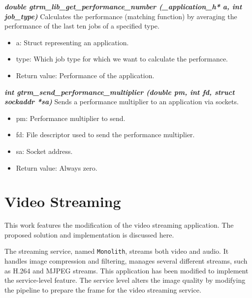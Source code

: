 \documentclass[nobiblatex]{LTHthesis}
\begin{document}
\begin{framed}
	\begin{flushleft}	
		\emph{\textbf{{double gtrm\_lib\_get\_performance\_number \newline
    (\_application\_h* a, int job\_type)}}} \newline
		Calculates the performance (matching function) by averaging 
    the performance of the last ten jobs of a specified type.
		\begin{itemize}
		\item a: Struct representing an application.
		\item type: Which job type for which we want to calculate 
      the performance.
		\item Return value: Performance of the application.
		\end{itemize}
	\end{flushleft}
\end{framed}

\begin{framed}
	\begin{flushleft}	
		\emph{\textbf{{int gtrm\_send\_performance\_multiplier \newline
	(double pm, int fd, struct sockaddr *sa)}}} \newline
		Sends a performance multiplier to an application via sockets.
		\begin{itemize} 
		\item pm: Performance multiplier to send.
		\item fd: File descriptor used to send the performance multiplier.
		\item sa: Socket address.
		\item Return value: Always zero.
		\end{itemize}
	\end{flushleft}
\end{framed}

\section{Video Streaming}

This work features the modification of the video streaming application.
 The proposed solution and implementation is discussed here.

The streaming service, named \texttt{Monolith}, streams both video and 
audio. It handles image compression and filtering, manages several different
streams, such as H.264 and MJPEG streams. This application has been modified
to implement the service-level feature. The service level alters the image
quality by modifying the pipeline to prepare the frame for the video
streaming service.
\end{document}

